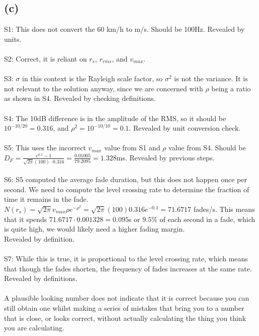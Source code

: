 \documentclass[]{article}
\begin{document}
\subsection*{(c)}
S1: This does not convert the 60 km/h to m/s. Should be 100Hz. Revealed by units. \\\\
S2: Correct, it is reliant on $r_s$, $r_{rms}$, and $v_{max}$.\\\\
S3: $\sigma$ in this context is the Rayleigh scale factor, so $\sigma^2$ is not the variance. It is not relevant to the solution anyway, since we are concerned with $\rho$ being a ratio as shown in S4. Revealed by checking definitions.\\\\
S4: The 10dB difference is in the amplitude of the RMS, so it should be $10^{-10/20} = 0.316$, and $\rho^2 = 10^{-10/10} = 0.1$. Revealed by unit conversion check. \\\\
S5: This uses the incorrect $v_{max}$ value from S1 and $\rho$ value from S4. Should be $D_F=\frac{e^{0.1} - 1}{\sqrt{2\pi}{(100)\cdot 0.316}} = \frac{0.01005}{79.2095} = 1.328$ms. Revealed by previous steps.\\\\
S6: S5 computed the average fade duration, but this does not happen once per second. We need to compute the level crossing rate to determine the fraction of time it remains in the fade. $N(r_s) = \sqrt{2\pi}v_{max}\rho e^{-\rho^2} =  \sqrt{2\pi}(100)0.316 e^{-0.1} = 71.6717$ fades/s. This means that it spends $71.6717 \cdot 0.001328 = 0.095$s or $9.5\%$ of each second in a fade, which is quite high, we would likely need a higher fading margin.
\\
Revealed by definition.\\\\
S7: While this is true, it is proportional to the level crossing rate, which means that though the fades shorten, the frequency of fades increases at the same rate. Revealed by definitions.\\\\

A plausible looking number does not indicate that it is correct because you can still obtain one whilst making a series of mistakes that bring you to a number that is close, or looks correct, without actually calculating the thing you think you are calculating.

\section{}
\end{document}
